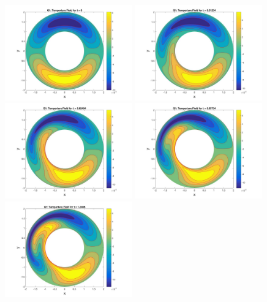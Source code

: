 \documentclass{article}
\begin{document}
	\begin{figure}[h!]
		\centering
		\includegraphics[width = 0.49\textwidth]{fig_q1_Q0}
		\includegraphics[width = 0.49\textwidth]{fig_q1Advect2}
		\includegraphics[width = 0.49\textwidth]{fig_q1Advect4}
		\includegraphics[width = 0.49\textwidth]{fig_q1Advect6}
		\includegraphics[width = 0.49\textwidth]{fig_q1Advect8}

\end{figure}
\end{document}
